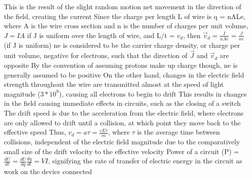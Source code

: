 \documentclass[11 pt, twoside]{article}
\newenvironment{outline*}
{
	\begin{outline}[enumerate]
	}
	{\end{outline}
}
\begin{document}
\begin{outline*}
\2 This is the result of the slight random motion net movement in the direction of the field, creating the current
\2 Since the charge per length L of wire is q = nALe, where A is the wire cross section and n is the number of charges per unit volume, $J = IA$ if J is uniform over the length of wire, and L/t = $v_d$, then $\vec{v}_d = \frac{I}{nAe} = \frac{J}{ne}$ (if J is uniform)
\3 ne is considered to be the carrier charge density, or charge per unit volume, negative for electrons, such that the direction of $\vec{J}$ and $\vec{v}_d$ are opposite
\3 By the convention of assuming protons make up charge though, ne is generally assumed to be positive
\2 On the other hand, changes in the electric field strength throughout the wire are transmitted almost at the speed of light magnitude ($3*10^9$), causing all electrons to begin to drift
\3 This results in changes in the field causing immediate effects in circuits, such as the closing of a switch
\2 The drift speed is due to the acceleration from the electric field, where electrons are only allowed to drift until a collision, at which point they move back to the effective speed
\3 Thus, $v_d = a\tau = \frac{eE\tau}{m}$, where $\tau$ is the average time between collisions, independent of the electric field magnitude due to the comparatively small size of the drift velocity to the effective velocity
\1 Power of a circuit (P) = $\frac{dU}{dt} = \frac{dU}{dq}\frac{dq}{dt} = VI$, signifying the rate of transfer of electric energy in the circuit as work on the device connected
\end{outline*}
\end{document}
